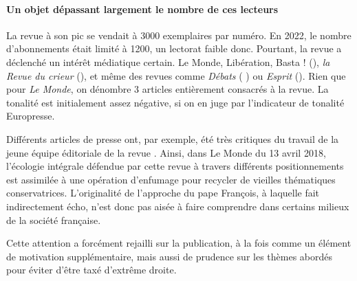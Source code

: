 \paragraph{Un objet dépassant largement le nombre de ces lecteurs} La revue à son pic se vendait à 3000 exemplaires par numéro. En 2022, le nombre d'abonnements était limité à 1200, un lectorat faible donc. Pourtant, la revue a déclenché un intérêt médiatique certain. Le Monde, Libération, Basta ! (\cite{Basta_2015_Limite}), \textit{la Revue du crieur} (\cite{carle_contre-revolutions_2017}),  et même des revues comme \textit{Débats} ( \cite{de_boissieu_quest_2016}) ou \textit{Esprit} (\cite{Schlegel_2018_Limite}). Rien que pour \textit{Le Monde}, on dénombre 3 articles entièrement consacrés à la revue. La tonalité est initialement assez négative, si on en juge par l'indicateur de tonalité Europresse.   

\begin{singlequote}
    Différents articles de presse ont, par exemple, été très critiques du travail de la jeune équipe éditoriale de la revue \RLimite. Ainsi, dans Le Monde du 13 avril 2018, l'écologie intégrale défendue par cette revue à travers différents positionnements est assimilée à une opération d'enfumage pour recycler de vieilles thématiques conservatrices. L'originalité de l'approche du pape François, à laquelle \RLimite fait indirectement écho, n'est donc pas aisée à faire comprendre dans certains milieux de la société française. \cite[p. 9]{lang_generations_2020}
\end{singlequote}

 Cette attention a forcément rejailli sur la publication, à la fois comme un élément de motivation supplémentaire, mais aussi de prudence sur les thèmes abordés pour éviter d'être taxé d'extrême droite.  

